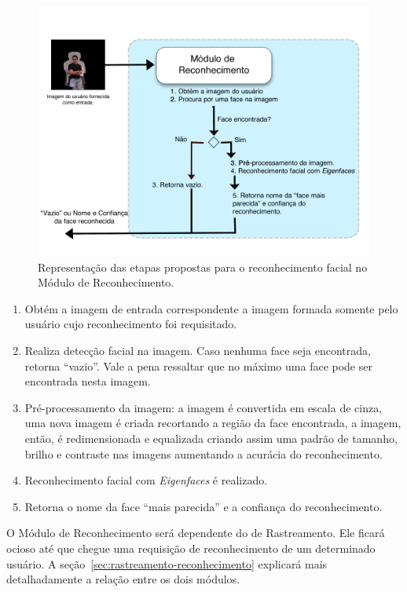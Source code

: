		\begin{figure}[hbt]
			\begin{center}
				\includegraphics[scale=2.0]{figuras/4.ProblemaEProposta/reconhecimento.png}
			\end{center}
			\caption{Representação das etapas propostas para o reconhecimento facial no Módulo de Reconhecimento.}
			\label{fig:processo-reconhecimento}
		\end{figure}

		\begin{enumerate}
			\item Obtém a imagem de entrada correspondente a imagem formada somente pelo usuário cujo reconhecimento foi requisitado.
			\item Realiza detecção facial na imagem. Caso nenhuma face seja encontrada, retorna ``vazio''. Vale a pena ressaltar que no máximo uma face pode ser encontrada nesta imagem.
			\item Pré-processamento da imagem: a imagem é convertida em escala de cinza, uma nova imagem é criada recortando a região da face encontrada, a imagem, então, é redimensionada e equalizada criando assim uma padrão de tamanho, brilho e contraste nas imagens aumentando a acurácia do reconhecimento.
			\item Reconhecimento facial com \textit{Eigenfaces} é realizado.
			\item Retorna o nome da face ``mais parecida'' e a confiança do reconhecimento.
		\end{enumerate}

	O Módulo de Reconhecimento será dependente do de Rastreamento. Ele ficará ocioso até que chegue uma requisição de reconhecimento de um determinado usuário. A seção~\ref{sec:rastreamento-reconhecimento} explicará mais detalhadamente a relação entre os dois módulos.

